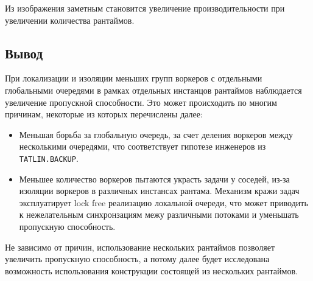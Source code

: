 Из изображения заметным становится увеличение производительности при увеличении количества рантаймов.

\subsection{Вывод}

При локализации и изоляции меньших групп воркеров с отдельными глобальными очередями в рамках отдельных инстанцов рантаймов наблюдается увеличение пропускной способности. Это может происходить по многим причинам, некоторые из которых перечислены далее:

\begin{itemize}
    \item Меньшая борьба за глобальную очередь, за счет деления воркеров между несколькими очередями, что соответствует гипотезе инженеров из \verb|TATLIN.BACKUP|.
    \item Меньшее количество воркеров пытаются украсть задачи у соседей, из-за изоляции воркеров в различных инстансах рантама. Механизм кражи задач эксплуатирует lock free реализацию локальной очереди, что может приводить к нежелательным синхронзациям межу различными потоками и уменьшать пропускную способность.
\end{itemize}

Не зависимо от причин, использование нескольких рантаймов позволяет увеличить пропускную способность, а потому далее будет исследована возможность использования конструкции состоящей из нескольких рантаймов.
